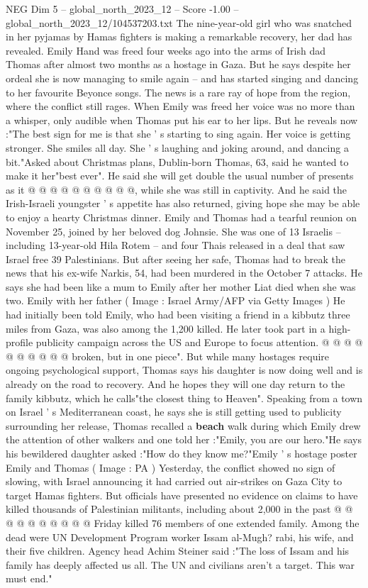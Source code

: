 \begin{textsample}{NEG Dim 5 – global\_north\_2023\_12 – Score -1.00 – global\_north\_2023\_12/104537203.txt}  \label{ex:f5_neg_111}
The nine-year-old girl who was snatched in her pyjamas by Hamas fighters is making a remarkable recovery, her dad has revealed.
Emily Hand was freed four weeks ago into the arms of Irish dad Thomas after almost two months as a hostage in Gaza.
But he says despite her ordeal she is now managing to smile again -- and has started singing and dancing to her favourite Beyonce songs.
The news is a rare ray of hope from the region, where the conflict still rages.
When Emily was freed her voice was no more than a whisper, only audible when Thomas put his ear to her lips.
But he reveals now :"The best sign for me is that she ' s starting to sing again.
Her voice is getting stronger.
She smiles all day.
She ' s laughing and joking around, and dancing a bit."Asked about Christmas plans, Dublin-born Thomas, 63, said he wanted to make it her"best ever".
He said she will get double the usual number of presents as it @ @ @ @ @ @ @ @ @ @, while she was still in captivity.
And he said the Irish-Israeli youngster ' s appetite has also returned, giving hope she may be able to enjoy a hearty Christmas dinner.
Emily and Thomas had a tearful reunion on November 25, joined by her beloved dog Johnsie.
She was one of 13 Israelis -- including 13-year-old Hila Rotem -- and four Thais released in a deal that saw Israel free 39 Palestinians.
But after seeing her safe, Thomas had to break the news that his ex-wife Narkis, 54, had been murdered in the October 7 attacks.
He says she had been like a mum to Emily after her mother Liat died when she was two.
Emily with her father ( Image : Israel Army/AFP via Getty Images ) He had initially been told Emily, who had been visiting a friend in a kibbutz three miles from Gaza, was also among the 1,200 killed.
He later took part in a high-profile publicity campaign across the US and Europe to focus attention. @ @ @ @ @ @ @ @ @ @ broken, but in one piece".
But while many hostages require ongoing psychological support, Thomas says his daughter is now doing well and is already on the road to recovery.
And he hopes they will one day return to the family kibbutz, which he calls"the closest thing to Heaven".
Speaking from a town on Israel ' s Mediterranean coast, he says she is still getting used to publicity surrounding her release, Thomas recalled a \textbf{beach} walk during which Emily drew the attention of other walkers and one told her :"Emily, you are our hero."He says his bewildered daughter asked :"How do they know me?"Emily ' s hostage poster Emily and Thomas ( Image : PA ) Yesterday, the conflict showed no sign of slowing, with Israel announcing it had carried out air-strikes on Gaza City to target Hamas fighters.
But officials have presented no evidence on claims to have killed thousands of Palestinian militants, including about 2,000 in the past @ @ @ @ @ @ @ @ @ @ Friday killed 76 members of one extended family.
Among the dead were UN Development Program worker Issam al-Mugh? rabi, his wife, and their five children.
Agency head Achim Steiner said :"The loss of Issam and his family has deeply affected us all.
The UN and civilians aren't a target.
This war must end."

\end{textsample}
